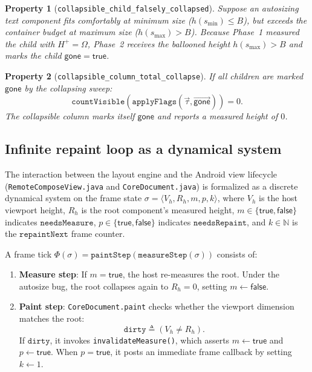 \documentclass[11pt,a4paper]{article}
\newcommand{\Om}{\Omega}
\newcommand{\gone}{\mathsf{gone}}
\newcommand{\lo}[1]{\texttt{#1}}       %
\newcommand{\jv}[1]{\texttt{#1}}       %
\theoremstyle{definition}
\theoremstyle{plain}
\newtheorem{property}{Property}[section]
\theoremstyle{remark}
\begin{document}
\begin{property}[\lo{collapsible\_child\_falsely\_collapsed}]
Suppose an autosizing text component fits comfortably at minimum size ($h(s_{\min}) \le B$),
but exceeds the container budget at maximum size ($h(s_{\max}) > B$).
Because Phase~1 measured the child with $H^+ = \Om$, Phase~2 receives the ballooned height
$h(s_{\max}) > B$ and marks the child $\gone = \textsf{true}$.
\end{property}

\begin{property}[\lo{collapsible\_column\_total\_collapse}]
If all children are marked $\gone$ by the collapsing sweep:
\[
  \lo{countVisible}(\lo{applyFlags}(\vec{\tau}, \vec{\gone})) = 0.
\]
The collapsible column marks itself $\gone$ and reports a measured height of $0$.
\end{property}

\subsection{Infinite repaint loop as a dynamical system}
\label{sec:autosize-repaint-loop}

The interaction between the layout engine and the Android view lifecycle
(\jv{RemoteComposeView.java} and \jv{CoreDocument.java}) is formalized as a discrete
dynamical system on the frame state $\sigma = \langle V_h, R_h, m, p, k \rangle$, where
$V_h$ is the host viewport height, $R_h$ is the root component's measured height,
$m \in \{\textsf{true}, \textsf{false}\}$ indicates $\lo{needsMeasure}$,
$p \in \{\textsf{true}, \textsf{false}\}$ indicates $\lo{needsRepaint}$, and
$k \in \mathbb{N}$ is the $\lo{repaintNext}$ frame counter.

A frame tick $\Phi(\sigma) = \lo{paintStep}(\lo{measureStep}(\sigma))$ consists of:
\begin{enumerate}
  \item \textbf{Measure step}: If $m = \textsf{true}$, the host re-measures the root.
    Under the autosize bug, the root collapses again to $R_h = 0$, setting $m \gets \textsf{false}$.
  \item \textbf{Paint step}: \jv{CoreDocument.paint} checks whether the viewport dimension matches the root:
    \[
      \lo{dirty} \triangleq (V_h \neq R_h).
    \]
    If $\lo{dirty}$, it invokes \jv{invalidateMeasure()}, which asserts $m \gets \textsf{true}$
    and $p \gets \textsf{true}$. When $p = \textsf{true}$, it posts an immediate frame callback by
    setting $k \gets 1$.
\end{enumerate}
\end{document}
